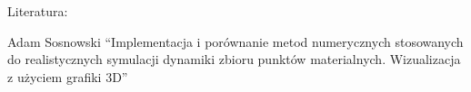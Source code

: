 
Literatura: \linebreak

Adam Sosnowski ``Implementacja i porównanie metod numerycznych stosowanych do realistycznych symulacji dynamiki zbioru punktów materialnych. Wizualizacja z użyciem grafiki 3D''

